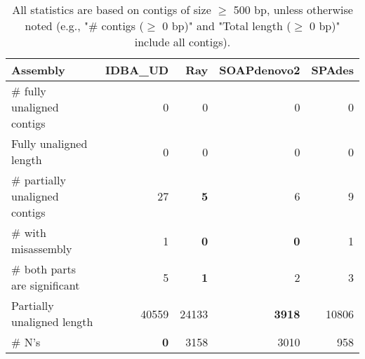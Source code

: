 \documentclass[12pt,a4paper]{article}
\begin{document}
\begin{table}[ht]
\begin{center}
\caption{All statistics are based on contigs of size $\geq$ 500 bp, unless otherwise noted (e.g., "\# contigs ($\geq$ 0 bp)" and "Total length ($\geq$ 0 bp)" include all contigs).}
\begin{tabular}{|l*{4}{|r}|}
\hline
Assembly & IDBA\_UD & Ray & SOAPdenovo2 & SPAdes \\ \hline
\# fully unaligned contigs & 0 & 0 & 0 & 0 \\ \hline
Fully unaligned length & 0 & 0 & 0 & 0 \\ \hline
\# partially unaligned contigs & 27 & {\bf 5} & 6 & 9 \\ \hline
\hspace{5mm}\# with misassembly & 1 & {\bf 0} & {\bf 0} & 1 \\ \hline
\hspace{5mm}\# both parts are significant & 5 & {\bf 1} & 2 & 3 \\ \hline
Partially unaligned length & 40559 & 24133 & {\bf 3918} & 10806 \\ \hline
\# N's & {\bf 0} & 3158 & 3010 & 958 \\ \hline
\end{tabular}
\end{center}
\end{table}
\end{document}
